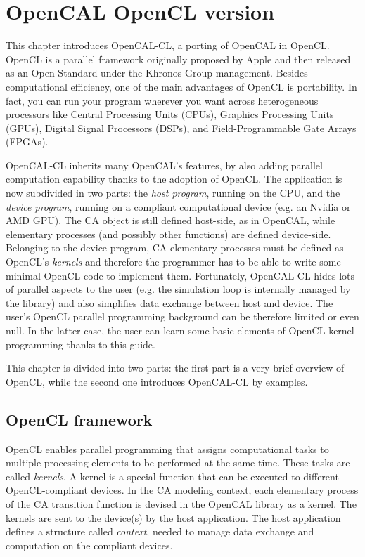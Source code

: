 \chapter{OpenCAL OpenCL version}\label{ch:opencal-cl}


This chapter introduces OpenCAL-CL, a porting of OpenCAL in
OpenCL. OpenCL is a parallel framework originally proposed by Apple
and then released as an Open Standard under the Khronos Group
management. Besides computational efficiency, one of the main
advantages of OpenCL is portability. In fact, you can run your program
wherever you want across heterogeneous processors like Central
Processing Units (CPUs), Graphics Processing Units (GPUs), Digital
Signal Processors (DSPs), and Field-Programmable Gate Arrays (FPGAs).

OpenCAL-CL inherits many OpenCAL's features, by also adding parallel
computation capability thanks to the adoption of OpenCL. The
application is now subdivided in two parts: the \emph{host program},
running on the CPU, and the \emph{device program}, running on a
compliant computational device (e.g. an Nvidia or AMD GPU). The CA
object is still defined host-side, as in OpenCAL, while elementary
processes (and possibly other functions) are defined
device-side. Belonging to the device program, CA elementary processes
must be defined as OpenCL's \emph{kernels} and therefore the
programmer has to be able to write some minimal OpenCL code to
implement them. Fortunately, OpenCAL-CL hides lots of parallel aspects
to the user (e.g. the simulation loop is internally managed by the
library) and also simplifies data exchange between host and
device. The user’s OpenCL parallel programming background can be
therefore limited or even null. In the latter case, the user can learn
some basic elements of OpenCL kernel programming thanks to this guide.

This chapter is divided into two parts: the first part is a very brief
overview of OpenCL, while the second one introduces OpenCAL-CL by
examples.

\section{OpenCL framework}\label{sec:openclstructure}
OpenCL enables parallel programming that assigns computational tasks
to multiple processing elements to be performed at the same
time. These tasks are called \emph{kernels}. A kernel is a special
function that can be executed to different OpenCL-compliant
devices. In the CA modeling context, each elementary process of the CA
transition function is devised in the OpenCAL library as a kernel.  The kernels are sent
to the device(s) by the host application. The host application defines
a structure called \emph{context}, needed to manage data exchange and
computation on the compliant devices.

